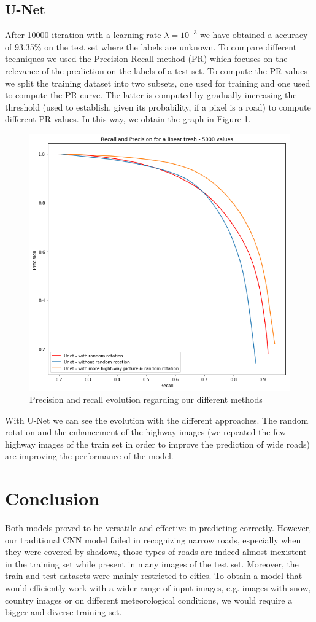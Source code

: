 \documentclass[10pt,conference,compsocconf]{IEEEtran}
\begin{document}
\subsection{U-Net}
	After 10000 iteration with a learning rate $\lambda = 10^{-3}$ we have obtained a accuracy of 93.35\% on the test set where the labels are unknown.
	To compare different techniques we used the Precision Recall method (PR) which focuses on the relevance of the prediction on the labels of a test set. To compute the PR values we split the training dataset into two subsets, one used for training and one used to compute the PR curve. The latter is computed by gradually increasing the threshold (used to establish, given its probability, if a pixel is a road) to compute different PR values. In this way, we obtain the graph in Figure \ref{fig:pr}.
	\begin{figure}[h]
		\centering
		\includegraphics[width=0.8\columnwidth]{img/pr_curve.png}
		\caption{Precision and recall evolution regarding our different methods}
		\label{fig:pr}
	\end{figure}
	With U-Net we can see the evolution with the different approaches. The random rotation and the enhancement of the highway images (we repeated the few highway images of the train set in order to improve the prediction of wide roads) are improving the performance of the model.

\section{Conclusion}
\label{sec:conclusion}
Both models proved to be versatile and effective in predicting correctly. However, our traditional CNN model failed in recognizing narrow roads, especially when they were covered by shadows, those types of roads are indeed almost inexistent in the training set while present in many images of the test set. Moreover, the train and test datasets were mainly restricted to cities. To obtain a model that would efficiently work with a wider range of input images, e.g. images with snow, country images or on different meteorological conditions, we would require a bigger and diverse training set.



\end{document}
